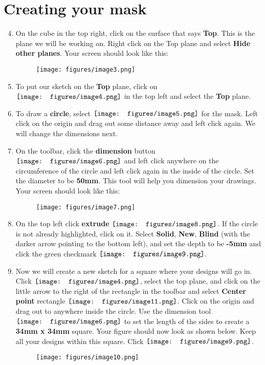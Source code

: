 \documentclass[12pt]{../manual}
\begin{document}
\section{Creating your mask}
\begin{enumerate}
\setcounter{enumi}{3}
\item On the cube in the top right, click on the surface that says {\bf Top}. This is the plane we will be working on. Right click on the Top plane and select {\bf Hide other planes}. Your screen should look like this:
\begin{figure}[ht!]
\centering
\texttt{[image: figures/image3.png]}
\end{figure}
\item To put our sketch on the {\bf Top} plane, click on $\vcenter{\hbox{\texttt{[image: figures/image4.png]}}}$ in the top left and select the {\bf Top} plane.
\item To draw a {\bf circle}, select $\vcenter{\hbox{\texttt{[image: figures/image5.png]}}}$ for the mask. Left click on the origin and drag out some distance away and left click again. We will change the dimensions next.

\newpage
\item On the toolbar, click the {\bf dimension} button $\vcenter{\hbox{\texttt{[image: figures/image6.png]}}}$ and left click anywhere on the circumference of the circle and left click again in the inside of the circle. Set the diameter to be {\bf 50mm}. This tool will help you dimension your drawings. Your screen should look like this:
\begin{figure}[ht]
\centering
\texttt{[image: figures/image7.png]}
\end{figure}
\item On the top left click {\bf extrude} $\vcenter{\hbox{\texttt{[image: figures/image8.png]}}}$. If the circle is not already highlighted, click on it. Select {\bf Solid}, {\bf New}, {\bf Blind} (with the darker arrow pointing to the bottom left), and set the depth to be {\bf -5mm} and click the green checkmark $\vcenter{\hbox{\texttt{[image: figures/image9.png]}}}$.
\item Now we will create a new sketch for a square where your designs will go in. Click $\vcenter{\hbox{\texttt{[image: figures/image4.png]}}}$, select the top plane, and click on the little arrow to the right of the rectangle in the toolbar and select {\bf Center point} rectangle $\vcenter{\hbox{\texttt{[image: figures/image11.png]}}}$. Click on the origin and drag out to anywhere inside the circle. Use the dimension tool $\vcenter{\hbox{\texttt{[image: figures/image6.png]}}}$ to set the length of the sides to create a {\bf 34mm x 34mm} square. Your figure should now look as shown below. Keep all your designs within this square. Click $\vcenter{\hbox{\texttt{[image: figures/image9.png]}}}$.
\begin{figure}[ht!]
\centering
\texttt{[image: figures/image10.png]}
\end{figure}
\end{enumerate}
\end{document}
